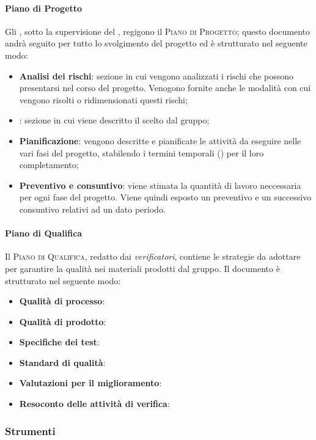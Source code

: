 \documentclass[../norme-di-progetto.tex]{subfiles}
\begin{document}
\paragraph{Piano di Progetto}
Gli \emph{}, sotto la supervisione del , regigono il \textsc{Piano di Progetto}; questo documento andrà seguito per tutto lo svolgimento del progetto ed è strutturato nel seguente modo:
\begin{itemize}
    \item \textbf{Analisi dei rischi}: sezione in cui vengono analizzati i rischi che possono presentarsi nel corso del progetto. Venogono fornite anche le modalità con cui vengono risolti o ridimensionati questi rischi;
    \item {}: sezione in cui viene descritto il  scelto dal gruppo;
    \item \textbf{Pianificazione}: vengono descritte e pianificate le attività da eseguire nelle vari fasi del progetto, stabilendo i termini temporali () per il loro completamento;
    \item \textbf{Preventivo e consuntivo}: viene stimata la quantità di lavoro neccessaria per ogni fase del progetto. Viene quindi esposto un preventivo e un successivo consuntivo relativi ad un dato periodo.
\end{itemize}

\paragraph{Piano di Qualifica}
Il \textsc{Piano di Qualifica}, redatto dai \emph{verificatori}, contiene le strategie da adottare per garantire la qualità nei materiali prodotti dal gruppo.
Il documento è strutturato nel seguente modo:
\begin{itemize}
    \item \textbf{Qualità di processo}:
    \item \textbf{Qualità di prodotto}:
    \item \textbf{Specifiche dei test}:
    \item \textbf{Standard di qualità}:
    \item \textbf{Valutazioni per il miglioramento}:
    \item \textbf{Resoconto delle attività di verifica}:
\end{itemize} 

\subsubsection{Strumenti}
\end{document}
